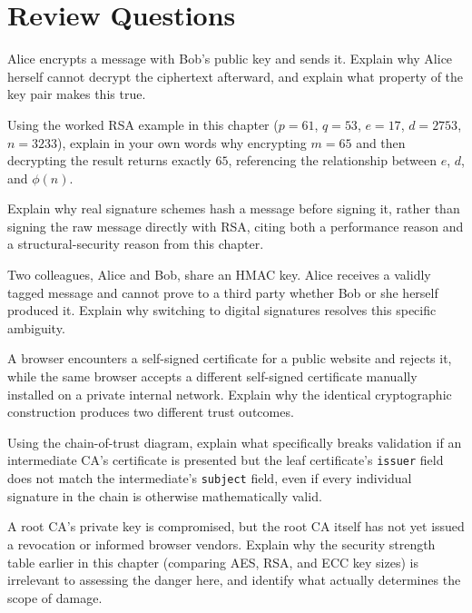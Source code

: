 \section*{Review Questions}
\begin{reviewquestions}
\item Alice encrypts a message with Bob's public key and sends it. Explain why Alice herself cannot
decrypt the ciphertext afterward, and explain what property of the key pair makes this true.
\item Using the worked RSA example in this chapter ($p=61$, $q=53$, $e=17$, $d=2753$, $n=3233$),
explain in your own words why encrypting $m=65$ and then decrypting the result returns exactly $65$,
referencing the relationship between $e$, $d$, and $\phi(n)$.
\item Explain why real signature schemes hash a message before signing it, rather than signing the
raw message directly with RSA, citing both a performance reason and a structural-security reason from
this chapter.
\item Two colleagues, Alice and Bob, share an HMAC key. Alice receives a validly tagged message and
cannot prove to a third party whether Bob or she herself produced it. Explain why switching to
digital signatures resolves this specific ambiguity.
\item A browser encounters a self-signed certificate for a public website and rejects it, while the
same browser accepts a different self-signed certificate manually installed on a private internal
network. Explain why the identical cryptographic construction produces two different trust outcomes.
\item Using the chain-of-trust diagram, explain what specifically breaks validation if an
intermediate CA's certificate is presented but the leaf certificate's \texttt{issuer} field does
not match the intermediate's \texttt{subject} field, even if every individual signature in the
chain is otherwise mathematically valid.
\item A root CA's private key is compromised, but the root CA itself has not yet issued a
revocation or informed browser vendors. Explain why the security strength table earlier in this
chapter (comparing AES, RSA, and ECC key sizes) is irrelevant to assessing the danger here, and
identify what actually determines the scope of damage.
\end{reviewquestions}

